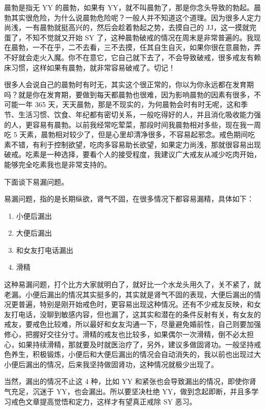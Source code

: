 \documentclass{ctexart}
\begin{document}
晨勃是指无 YY 的晨勃，如果有 YY，就不叫晨勃了，那是你念头导致的勃起。晨勃其实很危险，为什么说晨勃危险呢？一般人并不知道这个道理。因为很多人定力尚浅，一有晨勃就挺高兴的，然后会趁着勃起之势，去摸自己的 JJ，这一摸就完蛋了，不知不觉就又开始 SY 了，这种晨勃破戒的情况在周末是非常普遍的。我现在晨勃，一不在乎，二不去看，三不去摸，任其自生自灭，如果你很在意晨勃，弄不好就会走火入魔。你不在意它，它自己就下去了，不会导致破戒，很多戒友有赖床习惯，这样如果有晨勃，就非常容易破戒了。切记！

很多人会说自己的晨勃时有时无，其实这个很正常的，你以为你永远都在发育期吗？就是你在发育期，要做到每天都晨勃也很难，因为影响晨勃的因素有很多，不可能一年 365 天，天天晨勃，那是不现实的，为何晨勃会时有时无呢，这和季节、生活习惯、饮食、年纪都有密切关系，一般吃得好的人，并且消化吸收能力强的人，更容易有晨勃。以前我经常吃荤菜，那段时间我晨勃相对多些，现在我一周吃 5 天素，晨勃相对较少了，但是心里却清净很多，不容易起邪念。戒色期间吃素不错，有利于控制欲望，吃肉多容易助长欲望，如果定力尚浅，那就很容易出现破戒。吃素是一种选择，要看个人的接受程度，我建议广大戒友从减少吃肉开始，能够完全吃素我也是非常支持的。

下面谈下易漏问题。

易漏问题，指的是长期纵欲，肾气不固，在很多情况下都容易漏精，具体如下：

\begin{enumerate}
    \item 小便后漏出
    \item 大便后漏出
    \item 和女友打电话漏出
    \item 滑精
\end{enumerate}

这种易漏问题，打个比方大家就明白了，就好比一个水龙头用久了，关不紧了，就老漏。小便后漏出的情况其实挺多的，其实就是肾气不固的表现，大便后漏出的情况更普遍，特别是刚开始戒色时，更容易出现这种情况。还有不少戒友反映，和女友打电话，没聊到敏感内容，但也漏了，这其实和潜在的条件反射有关，有女友的戒友，要戒色比较难，所以最好和女友沟通一下，尽量避免婚前性，自己则要加强修心，把握好交往分寸。滑精的戒友也比较多，如果偶尔一次滑精，倒不必太担心，如果持续滑精，那就要及时就医治疗了，另外，建议多做固肾功。一般坚持戒色养生，积极锻炼，小便后和大便后漏出的情况会自动消失的，我以前也出现过大小便后漏出的情况，后来我坚持做固肾功，这种情况就极少出现了。

当然，漏出的情况不止这 4 种，比如 YY 和紧张也会导致漏出的情况，即使你肾气充足，沉迷于 YY，也会漏出。所以要坚决杜绝 YY，做到念起即断，并且多学习戒色文章提高觉悟和定力，这样才有望真正戒除 SY 恶习。
\end{document}
